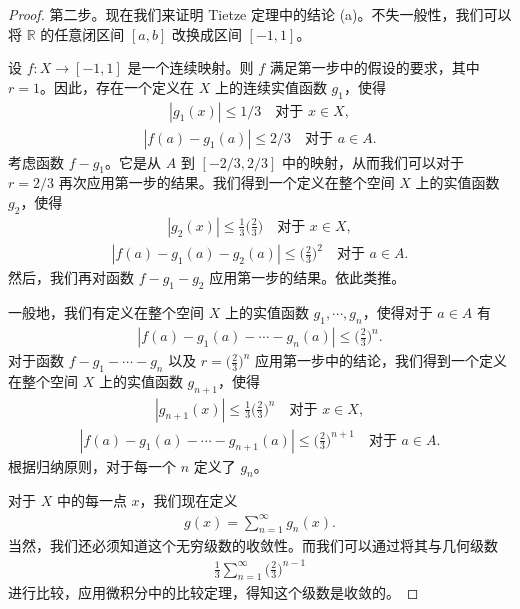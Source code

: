 \begin{proof}
第二步。现在我们来证明 Tietze 定理中的结论 (a)。不失一般性，我们可以将 $\mathbb{R}$ 的任意闭区间 $[a,b]$ 改换成区间 $[-1,1]$。

设 $f\colon X\to[-1,1]$ 是一个连续映射。则 $f$ 满足第一步中的假设的要求，其中 $r=1$。因此，存在一个定义在 $X$ 上的连续实值函数 $g_{1}$，使得
\begin{align*}
|g_{1}(x)|\leqslant 1/3\quad\text{对于 }x\in X,
\end{align*}
\begin{align*}
|f(a)-g_{1}(a)|\leqslant 2/3\quad\text{对于 }a\in A.
\end{align*}
考虑函数 $f-g_{1}$。它是从 $A$ 到 $[-2/3,2/3]$ 中的映射，从而我们可以对于 $r=2/3$ 再次应用第一步的结果。我们得到一个定义在整个空间 $X$ 上的实值函数 $g_{2}$，使得
\begin{align*}
|g_{2}(x)|\leqslant\frac{1}{3}\Big(\frac{2}{3}\Big)\quad\text{对于 }x\in X,
\end{align*}
\begin{align*}
|f(a)-g_{1}(a)-g_{2}(a)|\leqslant\Big(\frac{2}{3}\Big)^{2}\quad\text{对于 }a\in A.
\end{align*}
然后，我们再对函数 $f-g_{1}-g_{2}$ 应用第一步的结果。依此类推。

一般地，我们有定义在整个空间 $X$ 上的实值函数 $g_{1},\cdots,g_{n}$，使得对于 $a\in A$ 有
\begin{align*}
|f(a)-g_{1}(a)-\cdots-g_{n}(a)|\leqslant\Big(\frac{2}{3}\Big)^{n}.
\end{align*}
对于函数 $f-g_{1}-\cdots-g_{n}$ 以及 $r=\big(\frac{2}{3}\big)^{n}$ 应用第一步中的结论，我们得到一个定义在整个空间 $X$ 上的实值函数 $g_{n+1}$，使得
\begin{align*}
|g_{n+1}(x)|\leqslant\frac{1}{3}\Big(\frac{2}{3}\Big)^{n}\quad\text{对于 }x\in X,
\end{align*}
\begin{align*}
|f(a)-g_{1}(a)-\cdots-g_{n+1}(a)|\leqslant\Big(\frac{2}{3}\Big)^{n+1}\quad\text{对于 }a\in A.
\end{align*}
根据归纳原则，对于每一个 $n$ 定义了 $g_{n}$。

对于 $X$ 中的每一点 $x$，我们现在定义
\begin{align*}
g(x)=\sum_{n=1}^{\infty}g_{n}(x).
\end{align*}
当然，我们还必须知道这个无穷级数的收敛性。而我们可以通过将其与几何级数
\begin{align*}
\frac{1}{3}\sum_{n=1}^{\infty}\Big(\frac{2}{3}\Big)^{n-1}
\end{align*}
进行比较，应用微积分中的比较定理，得知这个级数是收敛的。


\end{proof}

